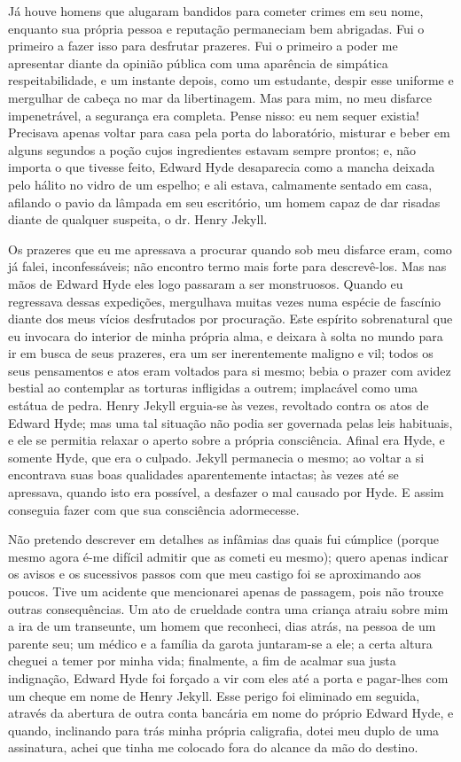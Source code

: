 Já houve homens que alugaram bandidos para cometer crimes em seu nome,
enquanto sua própria pessoa e reputação permaneciam bem abrigadas.  Fui
o primeiro a fazer isso para desfrutar prazeres.  Fui o primeiro a
poder me apresentar diante da opinião pública com uma aparência de
simpática respeitabilidade, e um instante depois, como um estudante,
despir esse uniforme e mergulhar de cabeça no mar da libertinagem.  Mas
para mim, no meu disfarce impenetrável, a segurança era completa. 
Pense nisso: eu nem sequer existia!  Precisava apenas voltar para casa
pela porta do laboratório, misturar e beber em alguns segundos a poção
cujos ingredientes estavam sempre prontos; e, não importa o que tivesse
feito, Edward Hyde desaparecia como a mancha deixada pelo hálito no
vidro de um espelho; e ali estava, calmamente sentado em casa, afilando
o pavio da lâmpada em seu escritório, um homem capaz de dar risadas
diante de qualquer suspeita, o dr. Henry Jekyll.

Os prazeres que eu me apressava a procurar quando sob meu disfarce eram,
como já falei, inconfessáveis; não encontro termo mais forte para
descrevê-los.  Mas nas mãos de Edward Hyde eles logo passaram a ser
monstruosos.  Quando eu regressava dessas expedições, mergulhava muitas
vezes numa espécie de fascínio diante dos meus vícios desfrutados por
procuração. Este  espírito sobrenatural que eu invocara do interior de
minha própria alma, e deixara à solta no mundo para ir em busca de seus
prazeres, era um ser inerentemente maligno e vil; todos os seus
pensamentos e atos eram voltados para si mesmo; bebia o prazer com
avidez bestial ao contemplar as torturas infligidas a outrem;
implacável como uma estátua de pedra.  Henry Jekyll erguia-se às vezes,
revoltado contra os atos de Edward Hyde; mas uma tal situação não podia
ser governada pelas leis habituais, e ele se permitia relaxar o aperto
sobre a própria consciência.  Afinal era Hyde, e somente Hyde, que era
o culpado.  Jekyll permanecia o mesmo; ao voltar a si encontrava suas
boas qualidades aparentemente intactas; às vezes até se apressava,
quando isto era possível, a desfazer o mal causado por Hyde.  E assim
conseguia fazer com que sua consciência adormecesse.

Não pretendo descrever em detalhes as infâmias das quais fui cúmplice
(porque mesmo agora é-me difícil admitir que as cometi eu mesmo); quero
apenas indicar os avisos e os sucessivos passos com que meu castigo foi
se aproximando aos poucos.  Tive um acidente que mencionarei apenas de
passagem, pois não trouxe outras consequências.  Um ato de crueldade
contra uma criança atraiu sobre mim a ira de um transeunte, um homem
que reconheci, dias atrás, na pessoa de um parente seu; um médico e a
família da garota juntaram-se a ele; a certa altura cheguei a temer por
minha vida; finalmente, a fim de acalmar sua justa indignação, Edward
Hyde foi forçado a vir com eles até a porta e pagar-lhes com um cheque
em nome de Henry Jekyll.  Esse perigo foi eliminado em seguida, através
da abertura de outra conta bancária em nome do próprio Edward Hyde, e
quando, inclinando para trás minha própria caligrafia, dotei meu duplo
de uma assinatura, achei que tinha me colocado fora do alcance da mão
do destino.

